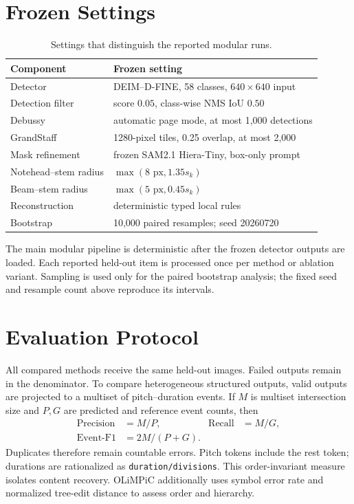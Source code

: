 \documentclass[letterpaper]{article}
\begin{document}
\section{Frozen Settings}
\begin{table}[h]
\centering
\footnotesize
\setlength{\tabcolsep}{3pt}
\begin{tabular}{@{}p{}p{}@{}}
\toprule
Component & Frozen setting \\
\midrule
Detector & DEIM--D-FINE, 58 classes, $640\!\times\!640$ input \\
Detection filter & score $0.05$, class-wise NMS IoU $0.50$ \\
Debussy & automatic page mode, at most 1,000 detections \\
GrandStaff & 1280-pixel tiles, 0.25 overlap, at most 2,000 \\
Mask refinement & frozen SAM2.1 Hiera-Tiny, box-only prompt \\
Notehead--stem radius & $\max(8\text{ px},1.35s_k)$ \\
Beam--stem radius & $\max(5\text{ px},0.45s_k)$ \\
Reconstruction & deterministic typed local rules \\
Bootstrap & 10,000 paired resamples; seed 20260720 \\
\bottomrule
\end{tabular}
\caption{Settings that distinguish the reported modular runs.}
\end{table}

The main modular pipeline is deterministic after the frozen detector outputs are loaded. Each reported held-out item is processed once per method or ablation variant. Sampling is used only for the paired bootstrap analysis; the fixed seed and resample count above reproduce its intervals.

\section{Evaluation Protocol}
All compared methods receive the same held-out images. Failed outputs remain in the denominator. To compare heterogeneous structured outputs, valid outputs are projected to a multiset of pitch--duration events. If $M$ is multiset intersection size and $P,G$ are predicted and reference event counts, then
\begin{align*}
  \mathrm{Precision}&=M/P, & \mathrm{Recall}&=M/G,\\
  \mathrm{Event\mbox{-}F1}&=2M/(P+G).&&
\end{align*}
Duplicates therefore remain countable errors. Pitch tokens include the rest token; durations are rationalized as \texttt{duration/divisions}. This order-invariant measure isolates content recovery. OLiMPiC additionally uses symbol error rate and normalized tree-edit distance to assess order and hierarchy.
\end{document}

